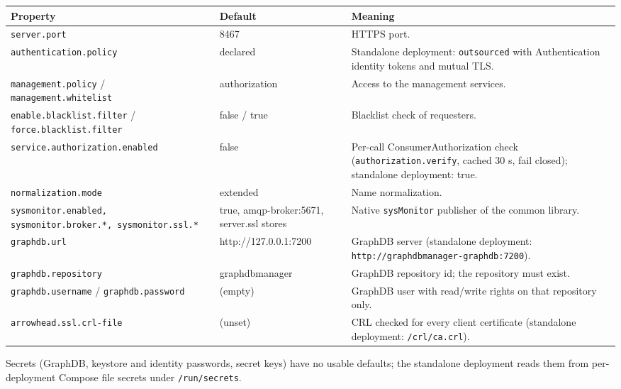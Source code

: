 \documentclass[a4paper]{arrowhead}
\begin{document}
\noindent\begin{longtable}{| p{5.4cm} | p{3.4cm} | p{6.4cm} |} \hline
\rowcolor{gray!33} Property & Default & Meaning \\ \hline \endhead
\texttt{server.\allowbreak{}port} & 8467 & HTTPS port. \\ \hline
\texttt{authentication.\allowbreak{}policy} & declared & Standalone deployment: \texttt{outsourced} with Authentication identity tokens and mutual TLS. \\ \hline
\texttt{management.\allowbreak{}policy} / \texttt{management.\allowbreak{}whitelist} & authorization & Access to the management services. \\ \hline
\texttt{enable.\allowbreak{}blacklist.\allowbreak{}filter} / \texttt{force.\allowbreak{}blacklist.\allowbreak{}filter} & false / true & Blacklist check of requesters. \\ \hline
\texttt{service.\allowbreak{}authorization.\allowbreak{}enabled} & false & Per-call Consumer\allowbreak{}Authorization check (\texttt{authorization.\allowbreak{}verify}, cached 30 s, fail closed); standalone deployment: true. \\ \hline
\texttt{normalization.\allowbreak{}mode} & extended & Name normalization. \\ \hline
\texttt{sysmonitor.\allowbreak{}enabled,\allowbreak{} sysmonitor.\allowbreak{}broker.\allowbreak{}*,\allowbreak{} sysmonitor.\allowbreak{}ssl.\allowbreak{}*} & true, amqp-broker:5671, server.ssl stores & Native \texttt{sysMonitor} publisher of the common library. \\ \hline
\texttt{graphdb.\allowbreak{}url} & http://127.0.0.1:7200 & GraphDB server (standalone deployment: \texttt{http://\allowbreak{}graphdbmanager-\allowbreak{}graphdb:7200}). \\ \hline
\texttt{graphdb.\allowbreak{}repository} & graphdbmanager & GraphDB repository id; the repository must exist. \\ \hline
\texttt{graphdb.\allowbreak{}username} / \texttt{graphdb.\allowbreak{}password} & (empty) & GraphDB user with read/write rights on that repository only. \\ \hline
\texttt{arrowhead.\allowbreak{}ssl.\allowbreak{}crl-\allowbreak{}file} & (unset) & CRL checked for every client certificate (standalone deployment: \texttt{/\allowbreak{}crl/\allowbreak{}ca.\allowbreak{}crl}). \\ \hline
\end{longtable}

Secrets (GraphDB, keystore and identity passwords, secret keys) have no usable defaults; the standalone deployment reads them from per-deployment Compose file secrets under \texttt{/\allowbreak{}run/\allowbreak{}secrets}.
\end{document}
